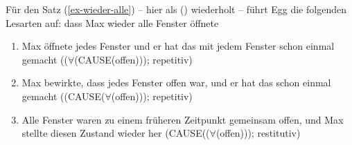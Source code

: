 Für den Satz (\ref{ex-wieder-alle}) -- hier als () wiederholt -- führt Egg die folgenden Lesarten auf:
\ea
\label{ex-wieder-alle-zwei}
dass Max wieder alle Fenster öffnete
\z
\begin{enumerate}
\item Max öffnete jedes Fenster und er hat das mit jedem Fenster schon einmal gemacht 
      (($\forall$(CAUSE(offen))); repetitiv)
\item Max bewirkte, dass jedes Fenster offen war, und er hat das schon einmal gemacht
      ((CAUSE($\forall$(offen))); repetitiv)
\item Alle Fenster waren zu einem früheren Zeitpunkt gemeinsam offen, und Max stellte diesen Zustand wieder her
      (CAUSE(($\forall$(offen))); restitutiv)
\end{enumerate}

